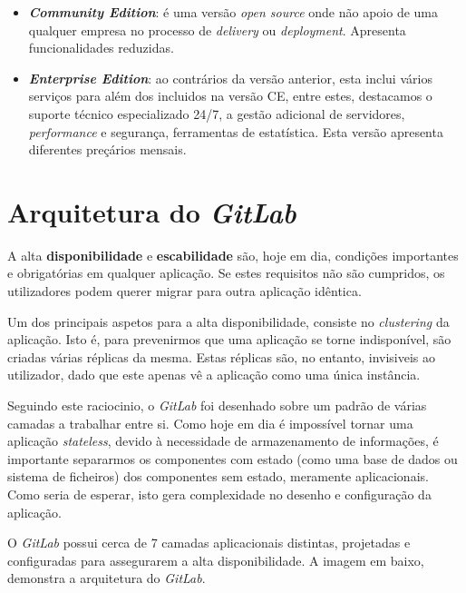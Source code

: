 \documentclass[12pt,a4paper]{article}
\begin{document}
\begin{itemize}
    \item \textbf{\emph{Community Edition}}: é uma versão \emph{open source} onde não apoio de uma qualquer empresa no processo de \emph{delivery} ou \emph{deployment}. Apresenta funcionalidades reduzidas.
    \item \textbf{\emph{Enterprise Edition}}: ao contrários da versão anterior, esta inclui vários serviços para além dos incluidos na versão CE, entre estes, destacamos o suporte técnico especializado 24/7, a gestão adicional de servidores, \emph{performance} e segurança, ferramentas de estatística. Esta versão apresenta diferentes preçários mensais.
\end{itemize}












\newpage
\section{Arquitetura do \emph{GitLab}}\label{arq}

A alta \textbf{disponibilidade} e \textbf{escabilidade} são, hoje em dia, condições importantes e obrigatórias em qualquer aplicação. Se estes requisitos não são cumpridos, os utilizadores podem querer migrar para outra aplicação idêntica.

Um dos principais aspetos para a alta disponibilidade, consiste no \emph{clustering} da aplicação. Isto é, para prevenirmos que uma aplicação se torne indisponível, são criadas várias réplicas da mesma. Estas réplicas são, no entanto, invisiveis ao utilizador, dado que este apenas vê a aplicação como uma única instância.

Seguindo este raciocinio, o \emph{GitLab} foi desenhado sobre um padrão de várias camadas a trabalhar entre si. Como hoje em dia é impossível tornar uma aplicação \emph{stateless}, devido à necessidade de armazenamento de informações, é importante separarmos os componentes com estado (como uma base de dados ou sistema de ficheiros) dos componentes sem estado, meramente aplicacionais. Como seria de esperar, isto gera complexidade no desenho e configuração da aplicação.

O \emph{GitLab} possui cerca de 7 camadas aplicacionais distintas, projetadas e configuradas para assegurarem a alta disponibilidade. A imagem em baixo, demonstra a arquitetura do \emph{GitLab}.
\end{document}
